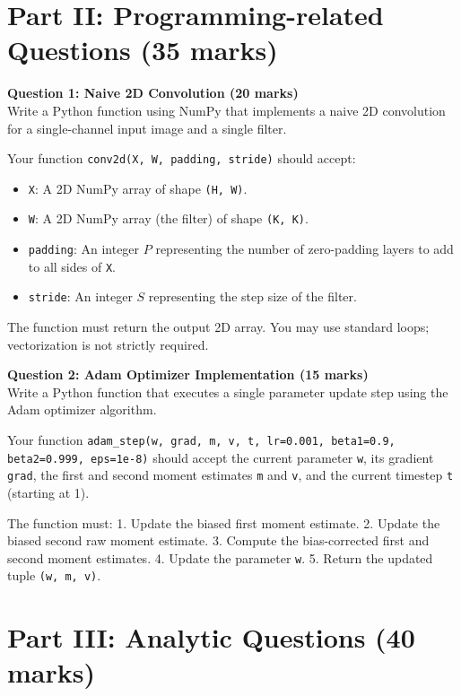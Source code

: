 \documentclass[11pt]{article}
\begin{document}
\vspace{1cm}

\section*{Part II: Programming-related Questions (35 marks)}

\textbf{Question 1: Naive 2D Convolution (20 marks)}\\
Write a Python function using NumPy that implements a naive 2D convolution for a single-channel input image and a single filter. 

Your function \texttt{conv2d(X, W, padding, stride)} should accept:
\begin{itemize}
    \item \texttt{X}: A 2D NumPy array of shape \texttt{(H, W)}.
    \item \texttt{W}: A 2D NumPy array (the filter) of shape \texttt{(K, K)}.
    \item \texttt{padding}: An integer $P$ representing the number of zero-padding layers to add to all sides of \texttt{X}.
    \item \texttt{stride}: An integer $S$ representing the step size of the filter.
\end{itemize}
The function must return the output 2D array. You may use standard loops; vectorization is not strictly required.

\vspace{0.5cm}

\textbf{Question 2: Adam Optimizer Implementation (15 marks)}\\
Write a Python function that executes a single parameter update step using the Adam optimizer algorithm.

Your function \texttt{adam\_step(w, grad, m, v, t, lr=0.001, beta1=0.9, beta2=0.999, eps=1e-8)} should accept the current parameter \texttt{w}, its gradient \texttt{grad}, the first and second moment estimates \texttt{m} and \texttt{v}, and the current timestep \texttt{t} (starting at 1).

The function must:
1. Update the biased first moment estimate.
2. Update the biased second raw moment estimate.
3. Compute the bias-corrected first and second moment estimates.
4. Update the parameter \texttt{w}.
5. Return the updated tuple \texttt{(w, m, v)}.

\vspace{1cm}

\section*{Part III: Analytic Questions (40 marks)}
\end{document}
